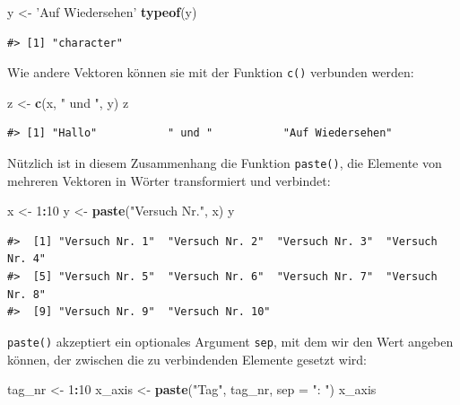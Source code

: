 \documentclass[]{book}
\newenvironment{Shaded}{\begin{snugshade}}{\end{snugshade}}
\newcommand{\KeywordTok}[1]{\textcolor[rgb]{0.13,0.29,0.53}{\textbf{#1}}}
\newcommand{\DataTypeTok}[1]{\textcolor[rgb]{0.13,0.29,0.53}{#1}}
\newcommand{\DecValTok}[1]{\textcolor[rgb]{0.00,0.00,0.81}{#1}}
\newcommand{\StringTok}[1]{\textcolor[rgb]{0.31,0.60,0.02}{#1}}
\newcommand{\OperatorTok}[1]{\textcolor[rgb]{0.81,0.36,0.00}{\textbf{#1}}}
\newcommand{\NormalTok}[1]{#1}
\begin{document}
\begin{Shaded}
\begin{Highlighting}[]
\NormalTok{y <-}\StringTok{ 'Auf Wiedersehen'}
\KeywordTok{typeof}\NormalTok{(y)}
\end{Highlighting}
\end{Shaded}

\begin{verbatim}
#> [1] "character"
\end{verbatim}

Wie andere Vektoren können sie mit der Funktion \texttt{c()} verbunden
werden:

\begin{Shaded}
\begin{Highlighting}[]
\NormalTok{z <-}\StringTok{ }\KeywordTok{c}\NormalTok{(x, }\StringTok{" und "}\NormalTok{, y)}
\NormalTok{z}
\end{Highlighting}
\end{Shaded}

\begin{verbatim}
#> [1] "Hallo"           " und "           "Auf Wiedersehen"
\end{verbatim}

Nützlich ist in diesem Zusammenhang die Funktion \texttt{paste()}, die
Elemente von mehreren Vektoren in Wörter transformiert und verbindet:

\begin{Shaded}
\begin{Highlighting}[]
\NormalTok{x <-}\StringTok{ }\DecValTok{1}\OperatorTok{:}\DecValTok{10}
\NormalTok{y <-}\StringTok{ }\KeywordTok{paste}\NormalTok{(}\StringTok{"Versuch Nr."}\NormalTok{, x)}
\NormalTok{y}
\end{Highlighting}
\end{Shaded}

\begin{verbatim}
#>  [1] "Versuch Nr. 1"  "Versuch Nr. 2"  "Versuch Nr. 3"  "Versuch Nr. 4" 
#>  [5] "Versuch Nr. 5"  "Versuch Nr. 6"  "Versuch Nr. 7"  "Versuch Nr. 8" 
#>  [9] "Versuch Nr. 9"  "Versuch Nr. 10"
\end{verbatim}

\texttt{paste()} akzeptiert ein optionales Argument \texttt{sep}, mit
dem wir den Wert angeben können, der zwischen die zu verbindenden
Elemente gesetzt wird:

\begin{Shaded}
\begin{Highlighting}[]
\NormalTok{tag_nr <-}\StringTok{ }\DecValTok{1}\OperatorTok{:}\DecValTok{10}
\NormalTok{x_axis <-}\StringTok{ }\KeywordTok{paste}\NormalTok{(}\StringTok{"Tag"}\NormalTok{, tag_nr, }\DataTypeTok{sep =} \StringTok{": "}\NormalTok{)}
\NormalTok{x_axis}
\end{Highlighting}
\end{Shaded}
\end{document}
